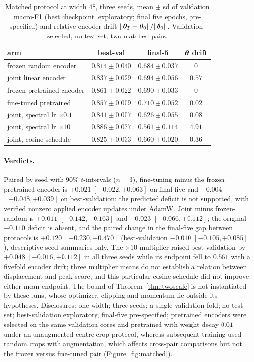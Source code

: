 \begin{table}[t]
\caption{Matched protocol at width $48$, three seeds, mean $\pm$ sd of
validation macro-F1 (best checkpoint, exploratory; final five epochs,
pre-specified) and relative encoder drift $\|{\boldsymbol{\theta}}_T-{\boldsymbol{\theta}}_0\|/\|{\boldsymbol{\theta}}_0\|$.
Validation-selected; no test set; two matched pairs.}
\label{tab:matched}
\begin{center}
\small
\begin{tabular}{lccc}
\toprule
arm & best-val & final-5 & ${\boldsymbol{\theta}}$ drift \\
\midrule
frozen random encoder      & $0.814\pm0.040$ & $0.684\pm0.037$ & $0$ \\
joint linear encoder       & $0.837\pm0.029$ & $0.694\pm0.056$ & $0.57$ \\
frozen pretrained encoder  & $0.861\pm0.022$ & $0.690\pm0.033$ & $0$ \\
fine-tuned pretrained      & $0.857\pm0.009$ & $0.710\pm0.052$ & $0.02$ \\
joint, spectral lr $\times0.1$ & $0.841\pm0.007$ & $0.626\pm0.055$ & $0.08$ \\
joint, spectral lr $\times10$  & $0.886\pm0.037$ & $0.561\pm0.114$ & $4.91$ \\
joint, cosine schedule     & $0.825\pm0.033$ & $0.660\pm0.020$ & $0.36$ \\
\bottomrule
\end{tabular}
\end{center}
\end{table}

\paragraph{Verdicts.}
Paired by seed with $90\%$ $t$-intervals ($n=3$), fine-tuning minus the
frozen pretrained encoder is $+0.021$ $[-0.022,+0.063]$ on final-five and
$-0.004$ $[-0.048,+0.039]$ on best-validation: the predicted deficit is not
supported, with verified nonzero applied encoder updates under AdamW.
Joint minus frozen-random is $+0.011$ $[-0.142,+0.163]$ and $+0.023$
$[-0.066,+0.112]$; the original $-0.110$ deficit is absent, and the paired
change in the final-five gap between protocols is $+0.120$
$[-0.230,+0.470]$ (best-validation $-0.010$ $[-0.105,+0.085]$), descriptive
seed summaries only. The $\times10$ multiplier raised best-validation by
$+0.048$ $[-0.016,+0.112]$ in all three seeds while its endpoint fell to
$0.561$ with a fivefold encoder drift; three multiplier means do not
establish a relation between displacement and peak score, and this
particular cosine schedule did not improve either mean endpoint. The bound
of Theorem~\ref{thm:twoscale} is not instantiated by these runs, whose
optimizer, clipping and momentum lie outside its hypotheses. Disclosures:
one width; three seeds; a single validation fold; no test set;
best-validation exploratory, final-five pre-specified; pretrained encoders
were selected on the same validation cores and pretrained with weight decay
$0.01$ under an unaugmented centre-crop protocol, whereas subsequent
training used random crops with augmentation, which affects cross-pair
comparisons but not the frozen versus fine-tuned pair
(Figure~\ref{fig:matched}).

